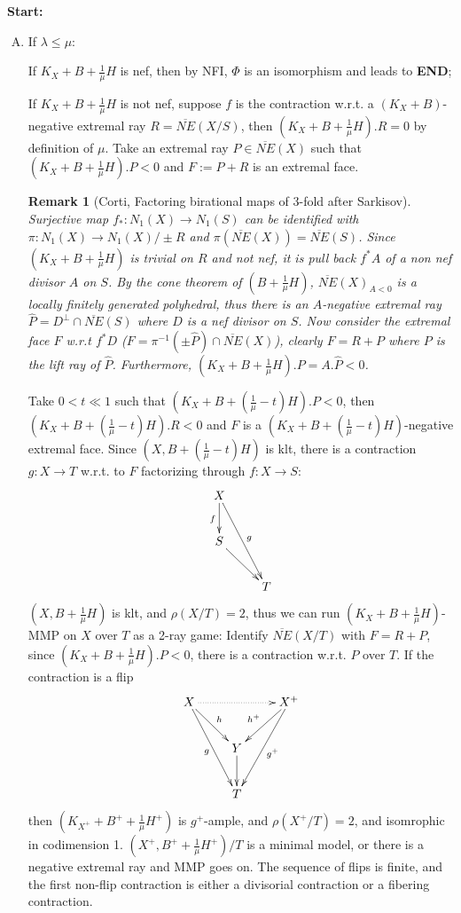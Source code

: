 \documentclass{article}
\newtheorem{rmk}[defn]{Remark}
\begin{document}
\textbf{Start:}
\begin{enumerate}[(A)]
  \item If $ \lambda\leqslant\mu $:
  
  If $ K_X+B+\frac{1}{\mu}H $ is nef, then by NFI, $ \Phi $ is an isomorphism and leads to \textbf{END};
  
  If $ K_X+B+\frac{1}{\mu}H $ is not nef, suppose $ f $ is the contraction w.r.t. a $ (K_X+B) $-negative extremal ray $ R= \overline{NE}(X/S) $, then $ (K_X+B+\frac{1}{\mu}H).R=0 $ by definition of $ \mu $.  Take an extremal ray $ P\in \overline{NE}(X) $ such that $ (K_X+B+\frac{1}{\mu}H).P<0 $ and $ F:=P+R $ is an extremal face.
  
  \begin{rmk}
    [Corti, Factoring birational maps of 3-fold after Sarkisov]
    
    Surjective map $ f_*:N_1(X)\to N_1(S) $ can be identified with $ \pi: N_1(X)\to N_1(X)/\pm R $ and $ \pi(\overline{NE}(X))=\overline{NE}(S) $. Since $ (K_X+B+\frac{1}{\mu}H) $ is trivial on $ R $ and not nef, it is pull back $ f^*A $ of a non nef divisor $ A $ on $ S $. By the cone theorem of $ (B+\frac{1}{\mu}H) $, $ \overline{NE}(X)_{A<0} $ is a locally finitely generated polyhedral, thus there is an  $ A $-negative extremal ray $ \hat P=D^\perp\cap \overline{NE}(S) $ where $ D $ is a nef divisor on $ S $. Now consider the extremal face $ F $ w.r.t $ f^*D $ ($ F=\pi^{-1}(\pm \hat P)\cap \overline{NE}(X) $), clearly $ F=R+P $ where $ P $ is the lift ray of $ \hat P $. Furthermore, $ (K_X+B+\frac{1}{\mu}H).P=A.\hat P<0 $.
  \end{rmk}
  Take  $ 0<t\ll 1 $ such that $ (K_X+B+(\frac{1}{\mu}-t)H).P<0 $, then $  (K_X+B+(\frac{1}{\mu}-t)H).R<0 $ and $ F $ is a $  (K_X+B+(\frac{1}{\mu}-t)H) $-negative extremal face. Since $ (X,B+(\frac{1}{\mu}-t)H) $ is klt, there is  a contraction $ g:X\to T $ w.r.t. to $ F $ factorizing through $ f:X\to S $: 
  $$ \xymatrix{
    X\ar[d]_f\ar[ddr]^g&\\
    S\ar[dr]&\\
    &T }$$
  $ (X,B+\frac{1}{\mu}H) $ is klt, and $ \rho(X/T)=2 $, thus we can  run $ (K_X+B+\frac{1}{\mu}H) $-MMP on $ X $ over $ T $ as a 2-ray game: Identify $ \overline{NE}(X/T) $ with $ F=R+P $, since $ (K_X+B+\frac{1}{\mu}H).P<0 $, there is a contraction w.r.t. $ P $ over $ T $. If the contraction is a flip
  $$ \xymatrix{
    X\ar[ddr]_g\ar@{.>}[rr]\ar[rd]^h&&X^+\ar[ddl]^{g^+}\ar[ld]_{h^+}\\
    &Y\ar[d]&\\
    &T&} $$ 
  then $ (K_{X^+}+B^++\frac{1}{\mu}H^+) $ is $ g^+ $-ample, and $ \rho(X^+/T)=2 $, and isomrophic in codimension 1. $ (X^+,B^++\frac{1}{\mu}H^+)/T $ is a minimal model, or there is a negative extremal ray and MMP goes on. The sequence of flips is finite, and the first non-flip contraction is either a divisorial contraction or a fibering contraction.
  

\end{enumerate}
\end{document}
